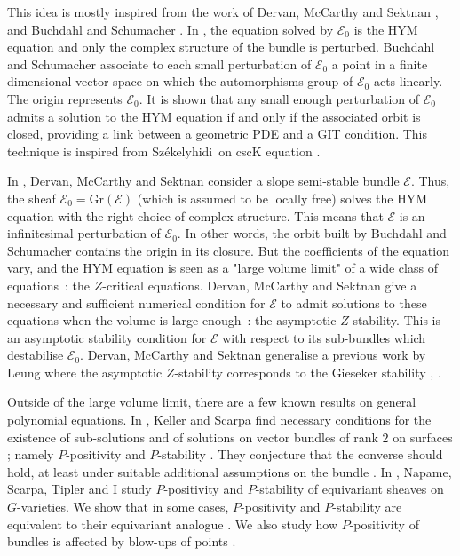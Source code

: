 \documentclass{article}
\theoremstyle{remark}
\theoremstyle{definition}
\newcommand{\E}{\mathcal{E}}
\newcommand{\Sz}{Székelyhidi}
\begin{document}
This idea is mostly inspired from the work of Dervan, McCarthy and Sektnan \cite{DMS}, and Buchdahl and Schumacher \cite{Buchdahl_Schumacher}. In \cite{Buchdahl_Schumacher}, the equation solved by $\E_0$ is the HYM equation and only the complex structure of the bundle is perturbed. Buchdahl and Schumacher associate to each small perturbation of $\E_0$ a point in a finite dimensional vector space on which the automorphisms group of $\E_0$ acts linearly. The origin represents $\E_0$. It is shown that any small enough perturbation of $\E_0$ admits a solution to the HYM equation if and only if the associated orbit is closed, providing a link between a geometric PDE and a GIT condition. This technique is inspired from \Sz\ on cscK equation \cite{Szkelyhidi}.

In \cite{DMS}, Dervan, McCarthy and Sektnan consider a slope semi-stable bundle $\E$. Thus, the sheaf $\E_0 = \mathrm{Gr}(\E)$ (which is assumed to be locally free) solves the HYM equation with the right choice of complex structure. This means that $\E$ is an infinitesimal perturbation of $\E_0$. In other words, the orbit built by Buchdahl and Schumacher contains the origin in its closure. But the coefficients of the equation vary, and the HYM equation is seen as a "large volume limit" of a wide class of equations~: the $Z$-critical equations. Dervan, McCarthy and Sektnan give a necessary and sufficient numerical condition for $\E$ to admit solutions to these equations when the volume is large enough~: the asymptotic $Z$-stability. This is an asymptotic stability condition for $\E$ with respect to its sub-bundles which destabilise $\E_0$. Dervan, McCarthy and Sektnan generalise a previous work by Leung \cite{Leung} where the asymptotic $Z$-stability corresponds to the Gieseker stability \cite[Sub-section 4.2]{Keller_Scarpa}, \cite[Example 3.13]{Delloque_2025}.

Outside of the large volume limit, there are a few known results on general polynomial equations. In \cite{Keller_Scarpa}, Keller and Scarpa find necessary conditions for the existence of sub-solutions and of solutions on vector bundles of rank $2$ on surfaces ; namely $P$-positivity and $P$-stability \cite[Theorem 1.1]{Keller_Scarpa}. They conjecture that the converse should hold, at least under suitable additional assumptions on the bundle \cite[Conjecture 1.4]{Keller_Scarpa}. In \cite{DNST}, Napame, Scarpa, Tipler and I study $P$-positivity and $P$-stability of equivariant sheaves on $G$-varieties. We show that in some cases, $P$-positivity and $P$-stability are equivalent to their equivariant analogue \cite[Theorem 1.9, Theorem 1.11]{DNST}. We also study how $P$-positivity of bundles is affected by blow-ups of points \cite[Theorem 1.13]{DNST}.
\end{document}
